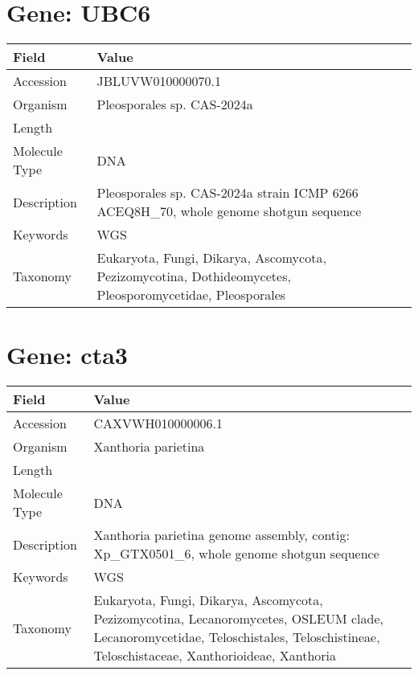 \documentclass[10pt]{article}
\begin{document}
\section{Gene: UBC6}
{\footnotesize
\begin{longtable}{>{\raggedright\arraybackslash}p{4.5cm} >{\raggedright\arraybackslash}p{11.5cm}}
\textbf{Field} & \textbf{Value} \\
\hline
Accession & JBLUVW010000070.1 \\
Organism & Pleosporales sp. CAS-2024a \\
Length & 129236 \\
Molecule Type & DNA \\
Description & Pleosporales sp. CAS-2024a strain ICMP 6266 ACEQ8H\_70, whole genome shotgun sequence \\
Keywords & WGS \\
Taxonomy & Eukaryota, Fungi, Dikarya, Ascomycota, Pezizomycotina, Dothideomycetes, Pleosporomycetidae, Pleosporales \\
\end{longtable}
}

\vspace{1em}
\section{Gene: cta3}
{\footnotesize
\begin{longtable}{>{\raggedright\arraybackslash}p{4.5cm} >{\raggedright\arraybackslash}p{11.5cm}}
\textbf{Field} & \textbf{Value} \\
\hline
Accession & CAXVWH010000006.1 \\
Organism & Xanthoria parietina \\
Length & 1643995 \\
Molecule Type & DNA \\
Description & Xanthoria parietina genome assembly, contig: Xp\_GTX0501\_6, whole genome shotgun sequence \\
Keywords & WGS \\
Taxonomy & Eukaryota, Fungi, Dikarya, Ascomycota, Pezizomycotina, Lecanoromycetes, OSLEUM clade, Lecanoromycetidae, Teloschistales, Teloschistineae, Teloschistaceae, Xanthorioideae, Xanthoria \\
\end{longtable}
}

\vspace{1em}
\end{document}
